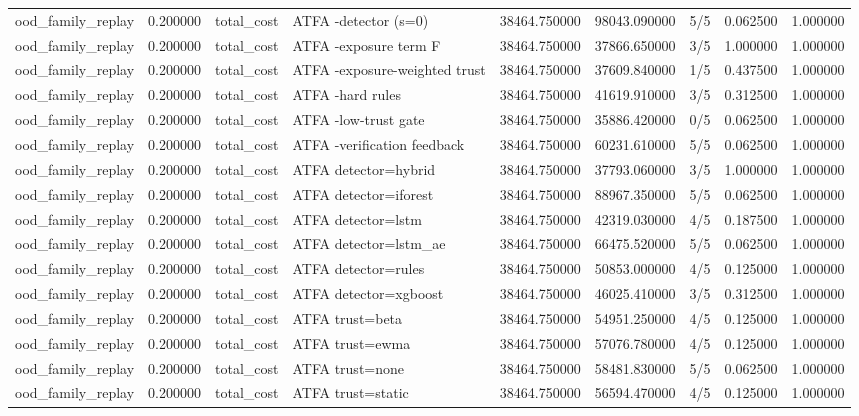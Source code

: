 \begin{tabular}{lrllrrlrr}
ood\_family\_replay & 0.200000 & total\_cost & ATFA -detector (s=0) & 38464.750000 & 98043.090000 & 5/5 & 0.062500 & 1.000000 \\
ood\_family\_replay & 0.200000 & total\_cost & ATFA -exposure term F & 38464.750000 & 37866.650000 & 3/5 & 1.000000 & 1.000000 \\
ood\_family\_replay & 0.200000 & total\_cost & ATFA -exposure-weighted trust & 38464.750000 & 37609.840000 & 1/5 & 0.437500 & 1.000000 \\
ood\_family\_replay & 0.200000 & total\_cost & ATFA -hard rules & 38464.750000 & 41619.910000 & 3/5 & 0.312500 & 1.000000 \\
ood\_family\_replay & 0.200000 & total\_cost & ATFA -low-trust gate & 38464.750000 & 35886.420000 & 0/5 & 0.062500 & 1.000000 \\
ood\_family\_replay & 0.200000 & total\_cost & ATFA -verification feedback & 38464.750000 & 60231.610000 & 5/5 & 0.062500 & 1.000000 \\
ood\_family\_replay & 0.200000 & total\_cost & ATFA detector=hybrid & 38464.750000 & 37793.060000 & 3/5 & 1.000000 & 1.000000 \\
ood\_family\_replay & 0.200000 & total\_cost & ATFA detector=iforest & 38464.750000 & 88967.350000 & 5/5 & 0.062500 & 1.000000 \\
ood\_family\_replay & 0.200000 & total\_cost & ATFA detector=lstm & 38464.750000 & 42319.030000 & 4/5 & 0.187500 & 1.000000 \\
ood\_family\_replay & 0.200000 & total\_cost & ATFA detector=lstm\_ae & 38464.750000 & 66475.520000 & 5/5 & 0.062500 & 1.000000 \\
ood\_family\_replay & 0.200000 & total\_cost & ATFA detector=rules & 38464.750000 & 50853.000000 & 4/5 & 0.125000 & 1.000000 \\
ood\_family\_replay & 0.200000 & total\_cost & ATFA detector=xgboost & 38464.750000 & 46025.410000 & 3/5 & 0.312500 & 1.000000 \\
ood\_family\_replay & 0.200000 & total\_cost & ATFA trust=beta & 38464.750000 & 54951.250000 & 4/5 & 0.125000 & 1.000000 \\
ood\_family\_replay & 0.200000 & total\_cost & ATFA trust=ewma & 38464.750000 & 57076.780000 & 4/5 & 0.125000 & 1.000000 \\
ood\_family\_replay & 0.200000 & total\_cost & ATFA trust=none & 38464.750000 & 58481.830000 & 5/5 & 0.062500 & 1.000000 \\
ood\_family\_replay & 0.200000 & total\_cost & ATFA trust=static & 38464.750000 & 56594.470000 & 4/5 & 0.125000 & 1.000000 \\

\end{tabular}
